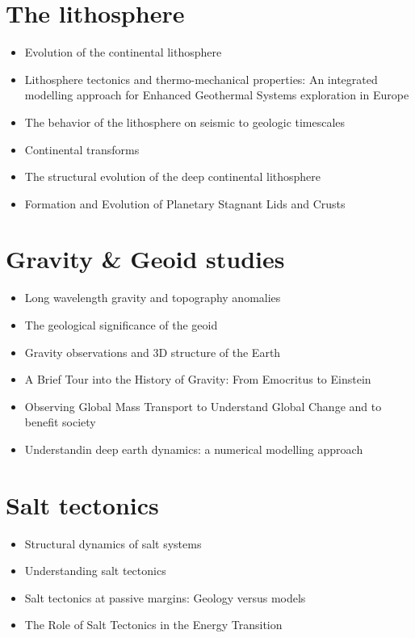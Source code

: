 \section{The lithosphere}
   \begin{itemize}
   \item[\twothousandfive] Evolution of the continental lithosphere \cite{slee05}
   \item[\twothousandten] Lithosphere tectonics and thermo-mechanical properties: An integrated modelling
         approach for Enhanced Geothermal Systems exploration in Europe \cite{clvz10}
   \item[\twothousandthirteen] The behavior of the lithosphere on seismic to geologic timescales \cite{wazh13}
   \item[\twothousandfourteen] Continental transforms \cite{noto14}
   \item[\twothousandseventeen] The structural evolution of the deep continental lithosphere \cite{comm17}
   \item[\twothousandtwentysix] Formation and Evolution of Planetary Stagnant Lids and Crusts \cite{midl26}
   \end{itemize}

\section{Gravity \& Geoid studies}
   \begin{itemize}
   \item[1981] Long wavelength gravity and topography anomalies \cite{wada81}
   \item[1985] The geological significance of the geoid \cite{chas85}
   \item[2006] Gravity observations and 3D structure of the Earth \cite{ricl06}
   \item[2013] A Brief Tour into the History of Gravity: From Emocritus to Einstein \cite{pamo13}
   \item[2015] Observing Global Mass Transport to Understand Global Change and to benefit society \cite{pabb15}
   \item[2017] Understandin deep earth dynamics: a numerical modelling approach \cite{siag17}
   \end{itemize}

\section{Salt tectonics}
   \begin{itemize}
   \item[1994] Structural dynamics of salt systems \cite{javs94}
   \item[2007] Understanding salt tectonics \cite{huja07}
   \item[2011] Salt tectonics at passive margins: Geology versus models \cite{brfo11}
   \item[2023] The Role of Salt Tectonics in the Energy Transition \cite{duhp23}
   \end{itemize}


